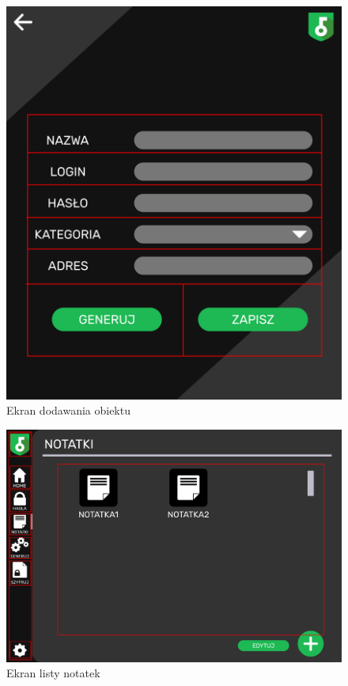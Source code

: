\documentclass[a4paper]{article}
\begin{document}
\begin{figure}[H]
    \centering
    \includegraphics[height=1\textwidth]{img/ekran_dodania.png}
    \caption{Ekran dodawania obiektu}
    \label{fig:haslaDodanie}
\end{figure}

\begin{figure}[H]
    \centering
    \includegraphics[width=1\textwidth]{img/ekran_notatek.png}
    \caption{Ekran listy notatek}
    \label{fig:notatki}
\end{figure}
\end{document}
